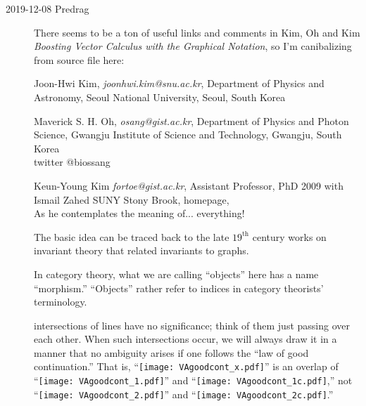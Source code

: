 \begin{description}
\item[2019-12-08 Predrag] There seems to be a ton of useful links and comments
in Kim, Oh and Kim
{\em Boosting Vector Calculus with the Graphical Notation},
so I'm canibalizing from  source file here:

{Joon-Hwi Kim},
{\em joonhwi.kim@snu.ac.kr},
{Department of Physics and Astronomy, Seoul National University, Seoul, South Korea}

{Maverick S. H. Oh},
{\em osang@gist.ac.kr},
{Department of Physics and Photon Science, Gwangju Institute of Science and Technology, Gwangju, South Korea}
\\
twitter @biossang

{Keun-Young Kim} {\em fortoe@gist.ac.kr}, %
Assistant Professor, PhD 2009  with Ismail Zahed SUNY Stony Brook,
{homepage},
\\ As he contemplates the meaning of...
 {everything!}

\bigskip

The basic idea can be traced back to the late $19^{\text{th}}$ century
works on invariant theory that related invariants to
graphs.\cite{Sylvester78,Clifford1878,Kempe1885,Cayley1857}

In category theory, what we are calling ``objects'' here has a name
``morphism.'' ``Objects'' rather refer to indices in category theorists'
terminology.

intersections of
lines have no significance; think of them just passing over each other.
When such intersections occur, we will always draw it in a manner that no
ambiguity arises if one follows the ``law of good continuation.'' That
is, ``\texttt{[image: VAgoodcont\_x.pdf]}'' is an
overlap of
``\texttt{[image: VAgoodcont\_1.pdf]}'' and
``\texttt{[image: VAgoodcont\_1c.pdf]},'' not
``\texttt{[image: VAgoodcont\_2.pdf]}'' and
``\texttt{[image: VAgoodcont\_2c.pdf]}.''


\end{description}
